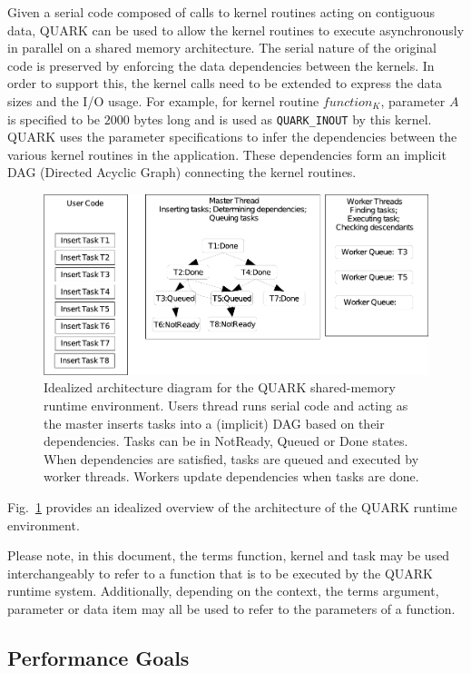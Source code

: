 \documentclass[11pt,letterpaper]{report}
\begin{document}
Given a serial code composed of calls to kernel routines acting on
contiguous data, QUARK can be used to allow the kernel routines to
execute asynchronously in parallel on a shared memory architecture.
The serial nature of the original code is preserved by enforcing the
data dependencies between the kernels.  In order to support this, the
kernel calls need to be extended to express the data sizes and the I/O
usage.  For example, for kernel routine $function_K$, parameter $A$ is
specified to be $2000$ bytes long and is used as \verb|QUARK_INOUT| by this
kernel.  QUARK uses the parameter specifications to infer the
dependencies between the various kernel routines in the application.
  These dependencies form an implicit DAG (Directed Acyclic Graph)
 connecting the kernel routines.
\begin{figure}[bt]
  \centering \includegraphics[trim=0 0 0 0, clip,
    width=1.0\columnwidth]{scheduler_architecture}
  \caption{Idealized architecture diagram for the QUARK shared-memory
    runtime environment.  Users thread runs serial code and acting as
    the master inserts tasks into a (implicit) DAG based on their
    dependencies.  Tasks can be in NotReady, Queued or Done states.
    When dependencies are satisfied, tasks are queued and executed by
    worker threads.  Workers update dependencies when tasks are done.}
  \label{fig:scheduler-architecture}
\end{figure}
Fig.~\ref{fig:scheduler-architecture} provides an idealized overview
of the architecture of the QUARK runtime environment.

Please note, in this document, the terms function, kernel and task may
be used interchangeably to refer to a function that is to be executed
by the QUARK runtime system.  Additionally, depending on the context,
the terms argument, parameter or data item may all be used to refer to
the parameters of a function.


\subsection{Performance Goals}
\end{document}
